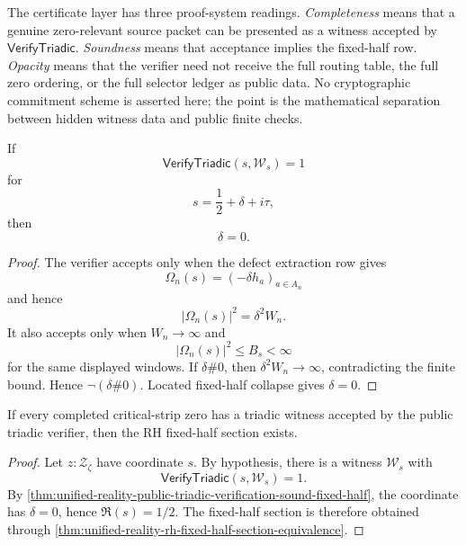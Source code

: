 \begin{definition}
\label{def:unified-reality-triadic-verifier-three-readings}
The certificate layer has three proof-system readings.
\emph{Completeness} means that a genuine zero-relevant source packet
can be presented as a witness accepted by
$\mathsf{VerifyTriadic}$.  \emph{Soundness} means that acceptance implies
the fixed-half row.  \emph{Opacity} means that the verifier need not
receive the full routing table, the full zero ordering, or the full
selector ledger as public data.  No cryptographic commitment scheme is
asserted here; the point is the mathematical separation between hidden
witness data and public finite checks.
\end{definition}

\begin{theorem}
\label{thm:unified-reality-public-triadic-verification-sound-fixed-half}
If
$$
\mathsf{VerifyTriadic}(s,\mathcal W_s)=1
$$
for
$$
s=\frac12+\delta+i\tau,
$$
then
$$
\delta=0.
$$
\end{theorem}

\begin{proof}
The verifier accepts only when the defect extraction row gives
$$
\Omega_n(s)=(-\delta h_a)_{a\in A_n}
$$
and hence
$$
|\Omega_n(s)|^2=\delta^2W_n.
$$
It also accepts only when $W_n\to\infty$ and
$$
|\Omega_n(s)|^2\le B_s<\infty
$$
for the same displayed windows.  If $\delta\#0$, then
$\delta^2W_n\to\infty$, contradicting the finite bound.  Hence
$\neg(\delta\#0)$.  Located fixed-half collapse gives $\delta=0$.
\end{proof}

\begin{corollary}
\label{cor:unified-reality-verified-triadic-witnesses-conditionally-sufficient}
If every completed critical-strip zero has a triadic witness accepted by
the public triadic verifier, then the RH fixed-half section exists.
\end{corollary}

\begin{proof}
Let $z:\mathcal Z_{\zeta}$ have coordinate $s$.  By hypothesis, there is
a witness $\mathcal W_s$ with
$$
\mathsf{VerifyTriadic}(s,\mathcal W_s)=1.
$$
By
\autoref{thm:unified-reality-public-triadic-verification-sound-fixed-half},
the coordinate has $\delta=0$, hence $\Re(s)=1/2$.  The fixed-half
section is therefore obtained through
\autoref{thm:unified-reality-rh-fixed-half-section-equivalence}.
\end{proof}

